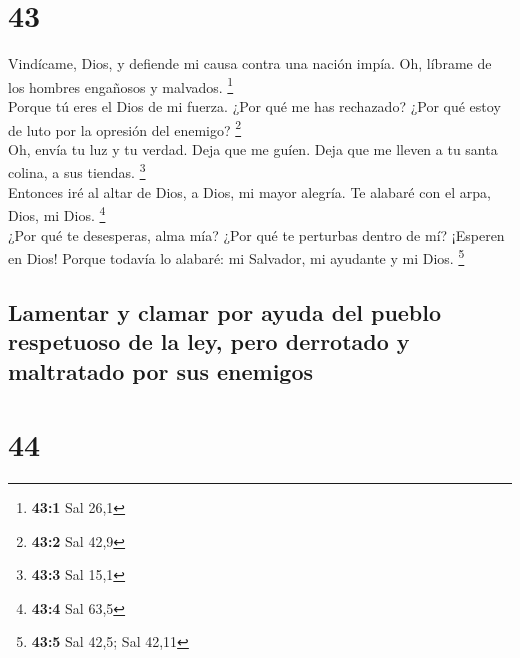 \hypertarget{section-41}{%
\section{43}\label{section-41}}

 Vindícame, Dios, y defiende mi causa contra una nación
impía. Oh, líbrame de los hombres engañosos y malvados. \footnote{\textbf{43:1}
  Sal 26,1}\\
 Porque tú eres el Dios de mi fuerza. ¿Por qué me has
rechazado? ¿Por qué estoy de luto por la opresión del enemigo?
\footnote{\textbf{43:2} Sal 42,9}\\
 Oh, envía tu luz y tu verdad. Deja que me guíen. Deja que
me lleven a tu santa colina, a sus tiendas. \footnote{\textbf{43:3} Sal
  15,1}\\
 Entonces iré al altar de Dios, a Dios, mi mayor alegría.
Te alabaré con el arpa, Dios, mi Dios. \footnote{\textbf{43:4} Sal 63,5}\\
 ¿Por qué te desesperas, alma mía? ¿Por qué te perturbas
dentro de mí? ¡Esperen en Dios! Porque todavía lo alabaré: mi Salvador,
mi ayudante y mi Dios. \footnote{\textbf{43:5} Sal 42,5; Sal 42,11}

\hypertarget{lamentar-y-clamar-por-ayuda-del-pueblo-respetuoso-de-la-ley-pero-derrotado-y-maltratado-por-sus-enemigos}{%
\subsection{Lamentar y clamar por ayuda del pueblo respetuoso de la ley,
pero derrotado y maltratado por sus
enemigos}\label{lamentar-y-clamar-por-ayuda-del-pueblo-respetuoso-de-la-ley-pero-derrotado-y-maltratado-por-sus-enemigos}}

\hypertarget{section-42}{%
\section{44}\label{section-42}}


